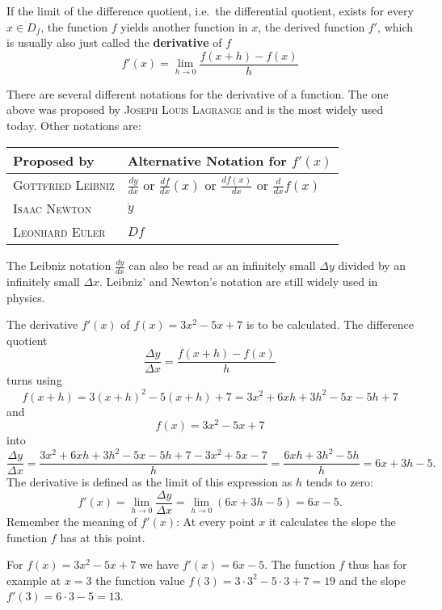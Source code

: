 \documentclass[12pt,eng]{skript_ogg}
\begin{document}
\begin{defn}[Derivative]
If the limit of the difference quotient, i.e.\ the differential quotient, exists for every  $x\in D_f$, the function $f$ yields another function in $x$, the derived function $f'$, which is usually also just called the \textbf{derivative} of $f$
\[f'(x)=\lim_{h\rightarrow 0}\frac{f(x+h)-f(x)}{h}\]
\end{defn} 
\begin{bemerkung}
There are several different notations for the derivative of a function. The one above was proposed by \textsc{Joseph Louis Lagrange} and is the most widely used today. Other notations are:
\begin{center}
	\begin{tabular}{l|l}
	Proposed by & Alternative Notation for $f'(x)$ \\ \hline
	\textsc{Gottfried Leibniz} & $\frac{dy}{dx}$ or $\frac{df}{dx}(x)$ or $\frac{df(x)}{dx}$ or $\frac{d}{dx}f(x)$\\[2mm]
	\textsc{Isaac Newton} & $\dot{y}$\\[2mm]
	\textsc{Leonhard Euler} & $Df$
	\end{tabular}
\end{center}
The Leibniz notation $\frac{dy}{dx}$ can also be read as an infinitely small $\Delta y$ divided by an infinitely small $\Delta x$. Leibniz' and Newton's notation are still widely used in physics. 
\end{bemerkung}

\begin{beispiel}
The derivative $f'(x)$ of $f(x)=3x^2-5x+7$ is to be calculated. The difference quotient
\[\frac{\Delta y}{\Delta x} =\frac{f(x+h)-f(x)}{h}\]
turns using
\[f(x+h)=3(x+h)^2-5(x+h)+7=3x^2+6xh+3h^2-5x-5h+7\]
and
\[f(x)=3x^2-5x+7\]
into
\[\frac{\Delta y}{\Delta x}=\frac{3x^2+6xh+3h^2-5x-5h+7-3x^2+5x-7}{h}=\frac{6xh+3h^2-5h}{h}=6x+3h-5.\]
The derivative is defined as the limit of this expression as $h$ tends to zero:
\[f'(x)=\lim_{h\rightarrow 0}\frac{\Delta y}{\Delta x}=\lim_{h\rightarrow 0}(6x+3h-5)=6x-5.\]
Remember the meaning of $f'(x)$: At every point $x$ it calculates the slope the function $f$ has at this point. 

For $f(x)=3x^2-5x+7$ we have $f'(x)=6x-5$. The function $f$ thus has for example at $x=3$ the function value $f(3)=3\cdot3^2-5\cdot3+7=19$ and the slope $f'(3)=6\cdot3-5=13$.
\end{beispiel}

\newpage
\end{document}
